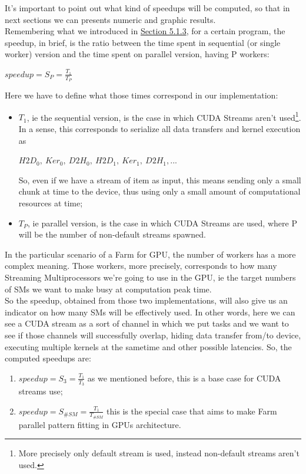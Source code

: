 It's important to point out what kind of speedups will be computed, so that in next sections we can presents numeric and graphic results.\\
Remembering what we introduced in \hyperref[subs:speedup]{Section 5.1.3}, for a certain program, the speedup, in brief, is the ratio between the time spent in sequential (or single worker) version and the time spent on parallel version, having P workers:
\begin{center}
	\(speedup = S_{P} = \frac{T_{1}}{T_{P}} \)
\end{center}
Here we have to define what those times correspond in our implementation:
\begin{itemize}
	\item \(T_{1}\), ie the sequential version, is the case in which CUDA Streams aren't used\footnote{More precisely only default stream is used, instead non-default streams aren't used.}. In a sense, this corresponds to serialize all data transfers and kernel execution as
	\begin{center}
		\(H2D_{0},\ Ker_{0},\ D2H_{0},\ H2D_{1},\ Ker_{1},\ D2H_{1}, . . .\)
	\end{center}
	So, even if we have a stream of item as input, this means sending only a small chunk at time to the device, thus using only a small amount of computational resources at time;
	\item \(T_{P}\), ie parallel version, is the case in which CUDA Streams are used, where P will be the number of non-default streams spawned.
\end{itemize}
In the particular scenario of a Farm for GPU, the number of workers has a more complex meaning. Those workers, more precisely, corresponds to how many Streaming Multiprocessors we're going to use in the GPU, ie the target numbers of SMs we want to make busy at computation peak time.\\
So the speedup, obtained from those two implementations, will also give us an indicator on how many SMs will be effectively used.
In other words, here we can see a CUDA stream as a sort of channel in which we put tasks and we want to see if those channels will successfully overlap, hiding data transfer from/to device, executing multiple kernels at the sametime and other possible latencies.
So, the computed speedups are:
\begin{enumerate}
	\item \(speedup = S_{3} = \frac{T_{1}}{T_{3}} \) as we mentioned before, this is a base case for CUDA streams use;
	\item \(speedup = S_{\#SM} = \frac{T_{1}}{T_{\#SM}} \) this is the special case that aims to make Farm parallel pattern fitting in GPUs architecture.\\
\end{enumerate}


